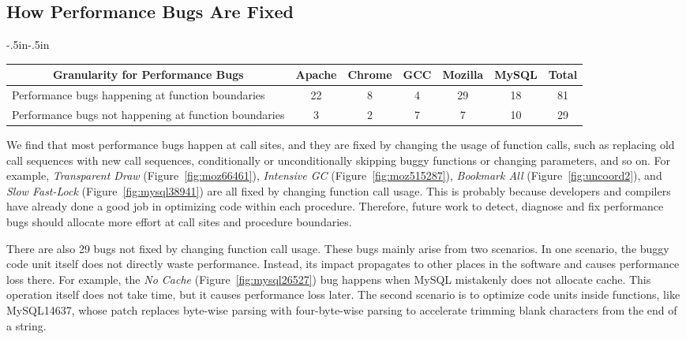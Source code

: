 \subsection{How Performance Bugs Are Fixed}
\label{sec:char_fix}

\begin{table*}[tb!]
\begin{adjustwidth}{-.5in}{-.5in}
\scriptsize
\centering
{

\begin{tabular}{|l|c|c|c|c|c|c|}
\toprule
\multicolumn{1}{|c|}{\bf Granularity for Performance Bugs} &Apache&Chrome&GCC&Mozilla&MySQL&Total\\
\midrule
\multicolumn{1}{|l|}{Performance bugs happening at function boundaries}
&22&8&4&29&18&81\\
\midrule
\multicolumn{1}{|l|}{Performance bugs not happening at function boundaries}
&3&2&7&7&10&29\\
\bottomrule

\end{tabular}
}
\end{adjustwidth}
\caption{Granularity categorization for performance bugs in Section~\ref{sec:char_fix}}
\label{tab:location}
\end{table*}

We find that most performance bugs happen at call sites, and they are fixed by changing the usage of function calls, 
such as replacing old call sequences with new call sequences, conditionally or unconditionally skipping buggy functions or changing parameters, and so on. 
For example, {\it Transparent Draw} (Figure~\ref{fig:moz66461}), {\it Intensive GC} (Figure~\ref{fig:moz515287}), 
{\it Bookmark All} (Figure~\ref{fig:uncoord2}), and
{\it Slow Fast-Lock} (Figure~\ref{fig:mysql38941}) are all fixed by changing function call usage.
This is probably because developers and compilers have already done a good job in optimizing code within each procedure. 
Therefore, future work to detect, diagnose and fix performance bugs should allocate more effort at call sites and procedure boundaries. 

There are also 29 bugs not fixed by changing function call usage. 
These bugs mainly arise from two scenarios. 
In one scenario, the buggy code unit itself does not directly waste performance. 
Instead, its impact propagates to other places in the software and causes performance loss there. 
For example, the {\it No Cache} (Figure~\ref{fig:mysql26527}) 
bug happens when MySQL mistakenly does not allocate cache. 
This operation itself does not take time, but it causes performance loss later. 
The second scenario is to optimize code units inside functions, like MySQL14637, whose patch replaces byte-wise parsing with
four-byte-wise parsing to accelerate trimming blank characters from the end of a string.


